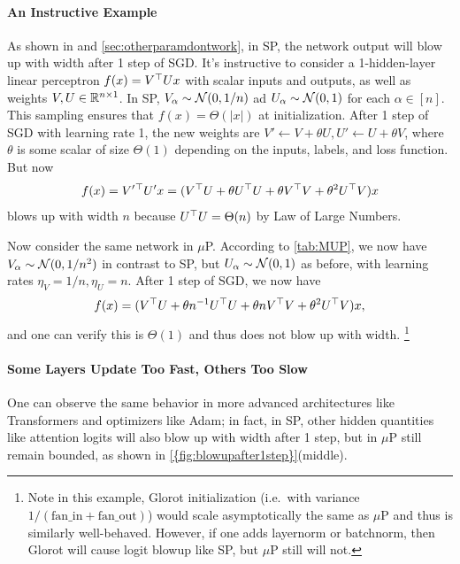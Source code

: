 \documentclass{article}
\theoremstyle{definition}
\newcommand{\fanin}{\mathrm{fan\_in}}
\newcommand{\fanout}{\mathrm{fan\_out}}
\begin{document}
  \paragraph{An Instructive Example}
  As shown in \citep{TP4} and \cref{sec:otherparamdontwork}, in SP, the network output will blow up with width after 1 step of SGD.
  It's instructive to consider a 1-hidden-layer linear perceptron $f(x) = V^\top U x$ with scalar inputs and outputs, as well as weights $V, U \in \mathbb{R}^{n \times 1}$.
  In SP, $V_\alpha \sim \mathcal{N}(0, 1/n)$ ad $U_\alpha \sim \mathcal{N}(0, 1)$ for each $\alpha \in [n]$.
  This sampling ensures that $f(x) = \Theta(|x|)$ at initialization.
  After 1 step of SGD with learning rate 1, the new weights are $V' \gets V + \theta U, U' \gets U + \theta V$, where $\theta$ is some scalar of size $\Theta(1)$ depending on the inputs, labels, and loss function.
  But now
  \begin{equation}
  f(x) = V'{}^\trsp U' x = (V^\trsp U + \theta U^\trsp U + \theta V^\trsp V + \theta^2 U^\trsp V) x
  \label{eqn:lin1lp1step}
  \end{equation}
  blows up with width $n$ because $U^\top U = \Theta(n)$ by Law of Large Numbers.

  Now consider the same network in $\mu$P.
  According to \cref{tab:MUP}, we now have $V_\alpha \sim \mathcal{N}(0, 1/n^2)$ in contrast to SP, but $U_\alpha \sim \mathcal{N}(0, 1)$ as before, with learning rates $\eta_{V} = 1/n, \eta_U = n$.
  After 1 step of SGD, we now have
  \[
    f(x) = (V^\top U + \theta n^{-1} U^\top U + \theta n V^\top V + \theta^2 U^\top V) x,
  \]
  and one can verify this is $\Theta(1)$ and thus does not blow up with width.
  \footnote{
  Note in this example, Glorot initialization \citep{glorot_understanding_2010} (i.e.\ with variance $1/(\fanin{} + \fanout{})$) would scale asymptotically the same as $\mu$P and thus is similarly well-behaved.
  However, if one adds layernorm or batchnorm, then Glorot will cause logit blowup like SP, but $\mu$P still will not.
  }
  
  \paragraph{Some Layers Update Too Fast, Others Too Slow}
  One can observe the same behavior in more advanced architectures like Transformers and optimizers like Adam;
  in fact, in SP, other hidden quantities like attention logits will also blow up with width after 1 step, but in $\mu$P still remain bounded, as shown in \cref{{fig:blowupafter1step}}(middle).
\end{document}
